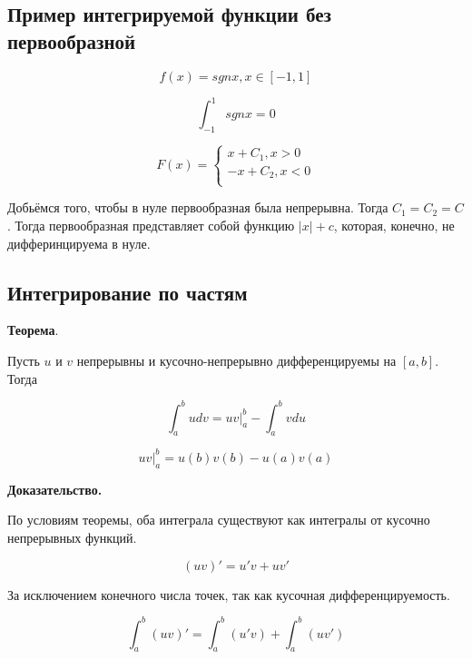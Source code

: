 \documentclass[a4paper]{article}
\begin{document}
\begin{definit}
\hypertarget{p15}{}
\subsection*{Пример интегрируемой функции без первообразной}

\[
f(x) = sgn x, x \in [-1,1]
\]

\[
\int_{-1}^1 sgn x = 0
\]

\[
F(x) = \begin{cases}
x+C_1, x>0\\
-x+C_2, x<0\\
\end{cases}
\]

Добьёмся того, чтобы в нуле первообразная была непрерывна. Тогда $C_1 = C_2 = C$. Тогда первообразная представляет собой функцию $|x|+c$, которая, конечно, не дифферинцируема в нуле.
\end{definit}


\begin{definit}
\hypertarget{p16}{}
\subsection*{Интегрирование по частям}

\begin{htheorem}\textbf{Теорема}.

Пусть $u$ и $v$ непрерывны и кусочно-непрерывно дифференцируемы на $[a,b]$. Тогда

\[
\int_a^b udv = uv |_a^b - \int_a^b vdu
\]

\[
uv |_a^b = u(b)v(b) - u(a)v(a)
\]
\end{htheorem}

\begin{hproof}\textbf{Доказательство.}

По условиям теоремы, оба интеграла существуют как интегралы от кусочно непрерывных функций.

\[
(uv)' = u'v + uv'
\]

За исключением конечного числа точек, так как кусочная дифференцируемость.

\[
\int_a^b (uv)' = \int_a^b (u'v) + \int_a^b (uv')
\]
\end{hproof}
\end{definit}
\end{document}
